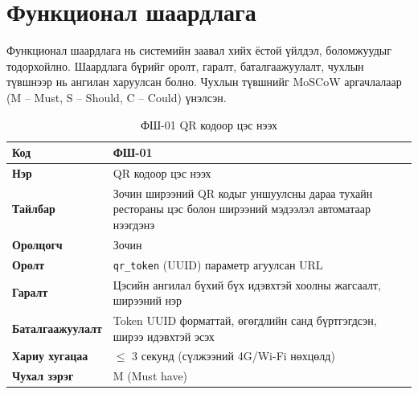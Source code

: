 \section{Функционал шаардлага}

Функционал шаардлага нь системийн заавал хийх ёстой үйлдэл, боломжуудыг
тодорхойлно. Шаардлага бүрийг оролт, гаралт, баталгаажуулалт, чухлын түвшнээр
нь ангилан харуулсан болно. Чухлын түвшнийг MoSCoW аргачлалаар (M -- Must,
S -- Should, C -- Could) үнэлсэн.

\begin{table}[htbp]
\caption{ФШ-01 QR кодоор цэс нээх}
\label{tab:fr01}
\centering
\small
\begin{tabularx}{\textwidth}{|l|L|}
\hline
{}
\textbf{Код} & ФШ-01 \\ \hline
\textbf{Нэр} & QR кодоор цэс нээх \\ \hline
{}
\textbf{Тайлбар} & Зочин ширээний QR кодыг уншуулсны дараа тухайн рестораны цэс болон ширээний мэдээлэл автоматаар нээгдэнэ \\ \hline
\textbf{Оролцогч} & Зочин \\ \hline
{}
\textbf{Оролт} & \texttt{qr\_token} (UUID) параметр агуулсан URL \\ \hline
\textbf{Гаралт} & Цэсийн ангилал бүхий бүх идэвхтэй хоолны жагсаалт, ширээний нэр \\ \hline
{}
\textbf{Баталгаажуулалт} & Token UUID форматтай, өгөгдлийн санд бүртгэгдсэн, ширээ идэвхтэй эсэх \\ \hline
\textbf{Хариу хугацаа} & $\leq$ 3 секунд (сүлжээний 4G/Wi-Fi нөхцөлд) \\ \hline
{}
\textbf{Чухал зэрэг} & M (Must have) \\ \hline
\end{tabularx}
\end{table}

